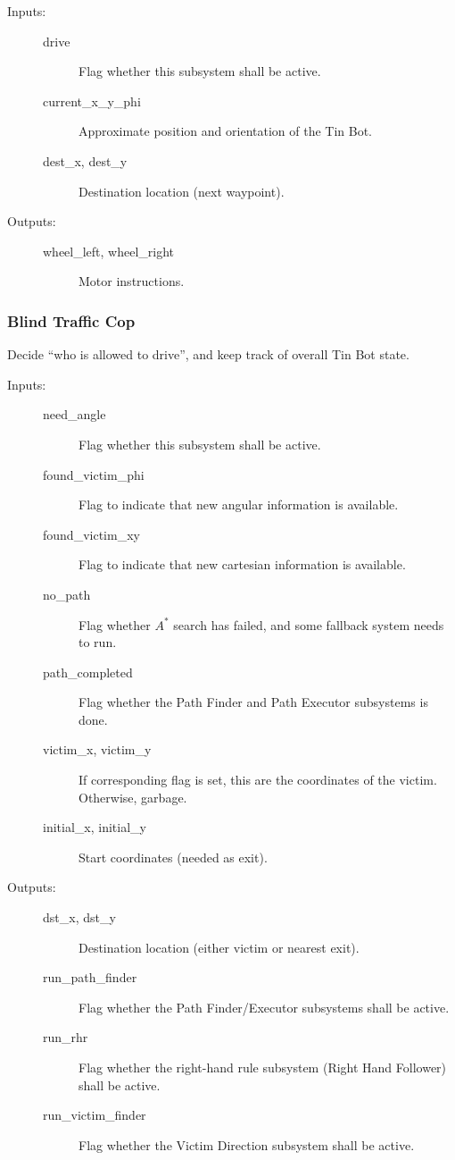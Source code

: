 \documentclass[a4paper,parskip,headheight=38pt]{scrartcl} %
\begin{document}
\begin{description}
\item[Inputs:] \hfill
    \begin{description}
    \item[drive] Flag whether this subsystem shall be active.
    \item[current\_x\_y\_phi] Approximate position and orientation of the Tin Bot.
  	\item[dest\_x, dest\_y] Destination location (next waypoint).
	\end{description}
\item[Outputs:] \hfill
	\begin{description}
	\item[wheel\_left, wheel\_right] Motor instructions.
	\end{description}
\end{description}

\subsubsection{Blind Traffic Cop}

Decide \enquote{who is allowed to drive}, and keep track of overall Tin Bot state.

\begin{description}
\item[Inputs:] \hfill
    \begin{description}
    \item[need\_angle] Flag whether this subsystem shall be active.
	\item[found\_victim\_phi] Flag to indicate that new angular information is available.
    \item[found\_victim\_xy] Flag to indicate that new cartesian information is available.
    \item[no\_path] Flag whether $A^\ast$ search has failed, and some fallback system needs to run.
    \item[path\_completed] Flag whether the Path Finder and Path Executor subsystems is done.
	\item[victim\_x, victim\_y] If corresponding flag is set, this are the coordinates of the victim.  Otherwise, garbage.
	\item[initial\_x, initial\_y] Start coordinates (needed as exit).
	\end{description}
\item[Outputs:] \hfill
	\begin{description}
  	\item[dst\_x, dst\_y] Destination location (either victim or nearest exit).
    \item[run\_path\_finder] Flag whether the Path Finder/Executor subsystems shall be active.
	\item[run\_rhr] Flag whether the right-hand rule subsystem (Right Hand Follower) shall be active.
	\item[run\_victim\_finder] Flag whether the Victim Direction subsystem shall be active.
	\end{description}
\end{description}
\end{document}
